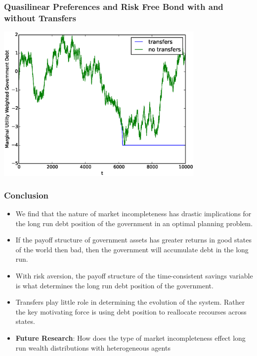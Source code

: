 \documentclass{beamer}
\begin{document}
\begin{frame}
	\frametitle{Quasilinear Preferences and Risk Free Bond  with and without Transfers}
	\begin{center}
	\includegraphics[width=4in]{Images/transfer_example2.eps}
	\end{center}
\end{frame}

 \begin{frame}
  \frametitle{Conclusion}
\begin{itemize}
	\item We find that the nature of market incompleteness has drastic implications for the long run debt position of the government in an optimal planning problem.
	\item If the payoff structure of government assets has greater returns in good states of the world then bad, then the government will accumulate debt in the long run.
	\item  With risk aversion, the payoff structure of the time-consistent savings variable is what determines the long run debt position of the government.
	\item  Transfers play little role in determining the evolution of the system.  Rather the key motivating force is using debt position to reallocate recourses across states.
	\item  \textbf{Future Research}:  How does the type of market incompleteness effect long run wealth distributions with heterogeneous agents
\end{itemize}
 \end{frame}

  
\end{document}
